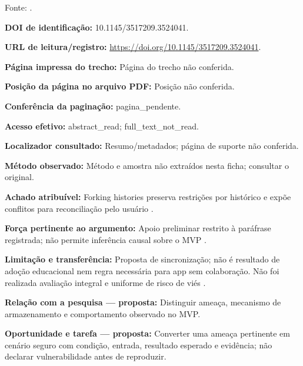 Fonte: \citet{OS08}.

\noindent\textbf{DOI de identificação:} 10.1145/3517209.3524041.\par\medskip

\noindent\textbf{URL de leitura/registro:} \url{https://doi.org/10.1145/3517209.3524041}.\par\medskip

\noindent\textbf{Página impressa do trecho:} Página do trecho não conferida.\par\medskip

\noindent\textbf{Posição da página no arquivo PDF:} Posição não conferida.\par\medskip

\noindent\textbf{Conferência da paginação:} pagina\_pendente.\par\medskip

\noindent\textbf{Acesso efetivo:} abstract\_read; full\_text\_not\_read.\par\medskip

\noindent\textbf{Localizador consultado:} Resumo/metadados; página de suporte não conferida.\par\medskip

\noindent\textbf{Método observado:} Método e amostra não extraídos nesta ficha; consultar o original.\par\medskip

\noindent\textbf{Achado atribuível:} Forking histories preserva restrições por histórico e expõe conflitos para reconciliação pelo usuário \citep{OS08}.\par\medskip

\noindent\textbf{Força pertinente ao argumento:} Apoio preliminar restrito à paráfrase registrada; não permite inferência causal sobre o MVP \citep{OS08}.\par\medskip

\noindent\textbf{Limitação e transferência:} Proposta de sincronização; não é resultado de adoção educacional nem regra necessária para app sem colaboração. Não foi realizada avaliação integral e uniforme de risco de viés \citep{OS08}.\par\medskip

\noindent\textbf{Relação com a pesquisa — proposta:} Distinguir ameaça, mecanismo de armazenamento e comportamento observado no MVP.\par\medskip

\noindent\textbf{Oportunidade e tarefa — proposta:} Converter uma ameaça pertinente em cenário seguro com condição, entrada, resultado esperado e evidência; não declarar vulnerabilidade antes de reproduzir.\par\medskip

